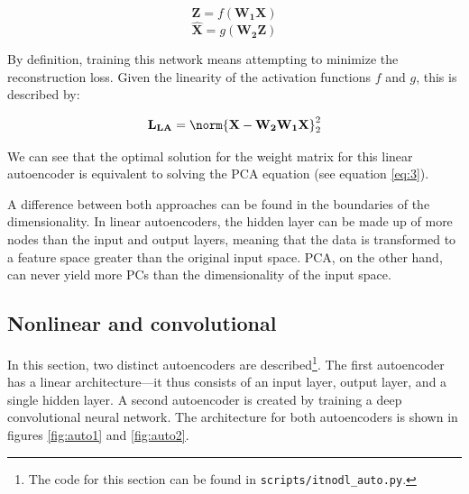 \begin{equation} \label{eq:4}
	\mathbf{Z} = f(\mathbf{W_1 X})
\end{equation}
\begin{equation}\label{eq:5}
	\mathbf{\hat{X}} = g(\mathbf{W_2 Z})
\end{equation}

By definition, training this network means attempting to minimize the reconstruction loss.  Given the linearity of the activation functions $f$ and $g$, this is described by:

\begin{equation} \label{eq:6}
	\mathbf{L_{LA}} = \norm{\mathbf{X} - \mathbf{W_2 W_1 X}}_2^2 
\end{equation}

We can see that the optimal solution for the weight matrix for this linear autoencoder is equivalent to solving the PCA equation (see equation \ref{eq:3}).

A difference between both approaches can be found in the boundaries of the dimensionality. In linear autoencoders, the hidden layer can be made up of more nodes than the input and output layers, meaning that the data is transformed to a feature space greater than the original input space. PCA, on the other hand, can never yield more PCs than the dimensionality of the input space.




\subsection{Nonlinear and convolutional}
\label{sec:auto2}

In this section, two distinct autoencoders are described\footnote{The code for this section can be found in \texttt{scripts/itnodl\_auto.py}.}. The first autoencoder has a linear architecture---it thus consists of an input layer, output layer, and a single hidden layer. A second autoencoder is created by training a deep convolutional neural network. The architecture for both autoencoders is shown in figures \ref{fig:auto1} and \ref{fig:auto2}. 

